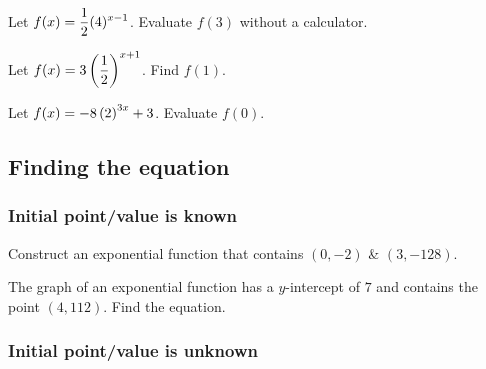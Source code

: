 \vspace{0.5em}

\begin{exercise}
Let $\displaystyle f(x)=\frac{1}{2}(4)^{x-1}$. Evaluate $f(3)$ without a calculator.
\end{exercise}
\begin{solution}[4in]

\end{solution}

\begin{exercise}
Let $\displaystyle f(x)=3\left(\frac{1}{2}\right)^{x+1}$. Find $f(1)$.
\end{exercise}
\begin{solution}[4in]

\end{solution}

\begin{exercise}
Let $\displaystyle f(x)=-8\left(2\right)^{3x}+3$. Evaluate $f(0)$.
\end{exercise}
\begin{solution}[2.5in]

\end{solution}

\subsection{Finding the equation}

\subsubsection*{Initial point/value is known}

\begin{exercise}
Construct an exponential function that contains $(0,-2)$ \& $(3,-128)$.
\end{exercise}
\begin{solution}[5in]

\end{solution}


\begin{exercise}
The graph of an exponential function has a $y$-intercept of $7$ and contains the point
$(4,112)$. Find the equation.
\end{exercise}
\begin{solution}[4in]

\end{solution}

\subsubsection*{Initial point/value is unknown}

